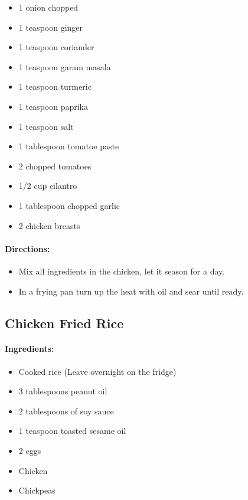 \documentclass{article}
\begin{document}
\begin{itemize}
	\item 1 onion chopped
	\item 1 teaspoon ginger
	\item 1 teaspoon coriander
	\item 1 teaspoon garam masala
	\item 1 teaspoon turmeric
	\item 1 teaspoon paprika
	\item 1 teaspoon salt
	\item 1 tablespoon tomatoe paste
	\item 2 chopped tomatoes
	\item 1/2 cup cilantro
	\item 1 tablespoon chopped garlic
	\item 2 chicken breasts
\end{itemize}

\paragraph{Directions:}
\begin{itemize}
	\item Mix all ingredients in the chicken, let it season for a day. 
	\item In a frying pan turn up the heat with oil and sear until ready.
\end{itemize}



\subsection{Chicken Fried Rice}

\paragraph{Ingredients:}

\begin{itemize}
	\item Cooked rice (Leave overnight on the fridge)
	\item 3 tablespoons peanut oil
	\item 2 tablespoons of soy sauce
	\item 1 teaspoon toasted sesame oil
	\item 2 eggs
	\item Chicken
	\item Chickpeas
\end{itemize}
\end{document}
